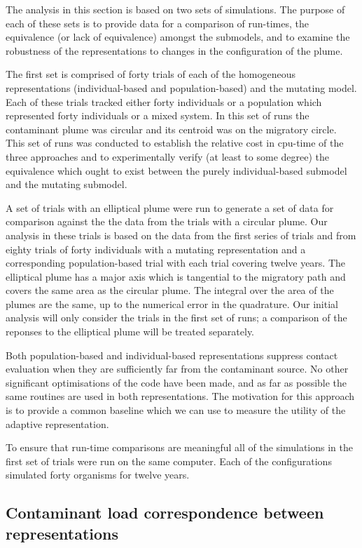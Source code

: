 \documentclass[preprint,authoryear,5p,twocolumn]{elsarticle}
\begin{document}
The analysis in this section is based on two sets of simulations. The purpose of each of these sets is to provide data
for a comparison of run-times, the equivalence (or lack of equivalence) amongst the submodels, and to examine the
robustness of the representations to changes in the configuration of the plume.

The first set is comprised of forty trials of each of the homogeneous representations (individual-based and
population-based) and the mutating model. Each of these trials tracked either forty individuals or a population which
represented forty individuals or a mixed system. In this set of runs the contaminant plume was circular and its
centroid was on the migratory circle. This set of runs was conducted to establish the relative cost in cpu-time of the
three approaches and to experimentally verify (at least to some degree) the equivalence which ought to exist between
the purely individual-based submodel and the mutating submodel.

A set of trials with an elliptical plume were run to generate a set of data for comparison against the the data from
the trials with a circular plume. Our analysis in these trials is based on the data from the first series of trials and
from eighty trials of forty individuals with a mutating representation and a corresponding population-based trial with
each trial covering twelve years. The elliptical plume has a major axis which is tangential to the migratory path and
covers the same area as the circular plume. The integral over the area of the plumes are the same, up to the numerical
error in the quadrature. Our initial analysis will only consider the trials in the first set of runs; a comparison of
the reponses to the elliptical plume will be treated separately.

Both population-based and individual-based representations suppress contact evaluation when they are sufficiently far
from the contaminant source. No other significant optimisations of the code have been made, and as far as possible the
same routines are used in both representations. The motivation for this approach is to provide a common baseline which
we can use to measure the utility of the adaptive representation.

To ensure that run-time comparisons are meaningful all of the simulations in the first set of trials were run on the
same computer. Each of the configurations simulated forty organisms for twelve years.

\subsection{Contaminant load correspondence between representations}
\end{document}
